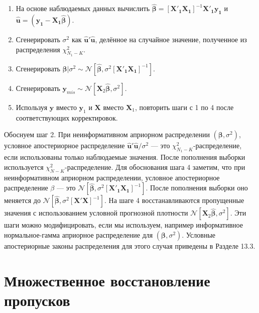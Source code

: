 \begin{enumerate}
\item	На основе наблюдаемых данных вычислить $\widehat{\mathbf{\beta}}=[\mathbf{X'_1 X_1}]^{-1}\mathbf{X'_1 y_1}$ и $\widehat{\mathbf{u}}=(\mathbf{y_1-X_1}\widehat{\mathbf{\beta}})$.
\item	Сгенерировать $\sigma^2$ как $\widehat{\mathbf{u}}'\widehat{\mathbf{u}}$, делённое на случайное значение, полученное из распределения $\chi^2_{N_1-K}$.
\item	Сгенерировать $\mathbf{\beta}|\sigma^2 \sim \mathcal{N}[\widehat{\mathbf{\beta}}, \sigma^2[\mathbf{X'_1 X_1}]^{-1}]$.
\item	Сгенерировать $\mathbf{y}_{mis} \sim \mathcal{N}[\mathbf{X}_2\widehat{\mathbf{\beta}}, \sigma^2]$.
\item	Используя $\mathbf{y}$ вместо $\mathbf{y}_1$ и $\mathbf{X}$ вместо $\mathbf{X}_1$, повторить шаги с 1 по 4 после соответствующих корректировок.
\end{enumerate}

Обоснуем шаг 2. При неинформативном априорном распределении $(\mathbf{\beta}, \sigma^2)$, условное апостериорное распределение $\widehat{\mathbf{u}}'\widehat{\mathbf{u}}/ \sigma^2$ --- это  $\chi^2_{N_1-K}$-распределение, если использованы только наблюдаемые значения. После пополнения выборки используется $\chi^2_{N-K}$-распределение. Для обоснования шага 4 заметим,  что при неинформативном априорном распределении, условное апостериорное распределение $\beta$ --- это $\mathcal{N}[\widehat{\mathbf{\beta}}, \sigma^2[\mathbf{X'_1 X_1}]^{-1}]$. После пополнения выборки оно меняется до $\mathcal{N}[\widehat{\mathbf{\beta}}, \sigma^2[\mathbf{X' X}]^{-1}]$. На шаге 4 восстанавливаются пропущенные значения с использованием условной прогнозной плотности $\mathcal{N}[\mathbf{X}_2\widehat{\mathbf{\beta}}, \sigma^2]$. Эти шаги можно модифицировать, если мы используем, например информативное нормальное-гамма априорное распределение для $(\mathbf{\beta}, \sigma^2)$. Условные апостериорные законы распределения для этого случая приведены в Разделе 13.3.



\section{Множественное восстановление пропусков}


